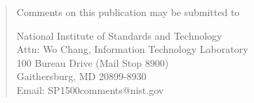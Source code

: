 \begin{titlepage}
\bigskip
\bigskip
\bigskip

\begin{quote}
Comments on this publication may be submitted to 

National Institute of Standards and Technology \\
Attn: Wo Chang, Information Technology Laboratory\\
100 Bureau Drive (Mail Stop 8900)\\ Gaithersburg, MD 20899-8930\\
Email: SP1500comments@nist.gov
\end{quote}

\vfill

\end{titlepage}
